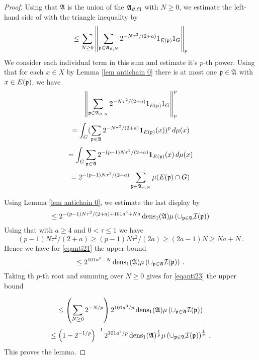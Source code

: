 \begin{proof}


Using that $\mathfrak{A}$ is the union of the
$\mathfrak{A_{\vartheta,N}}$ with $N\ge 0$,
we estimate the left-hand side of
with the triangle inequality by
\begin{equation}\label{eqanti23}
\le \sum_{N\ge 0} \left\|\sum_{\mathfrak p\in \mathfrak{A}_{\vartheta,N}} 2^{-N\tau^2/(2+a)}1_{E(\mathfrak p)} 1_G\right\|_{p}
\end{equation}
We consider each individual term in this sum and estimate it's $p$-th power.
    Using that for each $x\in X$  by Lemma \ref{lem antichain 0} there is at most one $\mathfrak p\in \mathfrak{A}$ with $x\in E(\mathfrak p)$,
    we have
    \begin{equation}
        \left\|\sum_{\mathfrak p\in \mathfrak{A}_{\vartheta,N}} 2^{-N\tau^2/(2+a)}1_{E(\mathfrak p)} 1_G\right\|_{p}^p
    \end{equation}
\begin{equation}
    =\int_G(\sum_{\mathfrak p\in\mathfrak{A}}2^{-N\tau^2/(2+a)}\mathbf{1}_{E(\mathfrak p)}(x))^p\, d\mu(x)
\end{equation}
\begin{equation}
    =   \int _G\sum_{\mathfrak p\in\mathfrak{A}}2^{-(p-1)N\tau^2/(2+a)}\mathbf{1}_{E(\mathfrak p)}(x)\, d\mu(x)
\end{equation}
\begin{equation}
    =   2^{-(p-1)N\tau^2/(2+a)} \sum_{\mathfrak p\in\mathfrak{A}_{\vartheta,N}}\mu(E(\mathfrak p)\cap G)
\end{equation}

Using Lemma \ref{lem antichain 0}, we estimate the last display by
\begin{equation}\label{eqanti21}
\le  2^{-(p-1)N\tau^2/(2+a)+101a^3+Na}\operatorname{\operatorname{dens}}_1(\mathfrak{A})\mu\left(\cup_{\mathfrak p\in\mathfrak{A}}\mathcal{I}(\mathfrak p)\right)
\end{equation}
Using that with $a\ge 4$ and $0<\tau\le 1$ we have
\begin{equation}
(p-1)N\tau^2/(2+a)\ge
(p-1)N\tau^2/(2a)\ge (2a -1)N\ge Na+N\, .
\end{equation}
Hence we have for \eqref{eqanti21} the upper bound
\begin{equation}\label{eqanti22}
\le  2^{101a^3-N}\operatorname{\operatorname{dens}}_1(\mathfrak{A})\mu\left(\cup_{\mathfrak p\in\mathfrak{A}}\mathcal{I}(\mathfrak p)\right)\, .
\end{equation}
Taking th $p$-th root and summing over $N\ge 0$ gives for \eqref{eqanti23} the upper bound

\begin{equation}
\le \left(\sum_{N\ge 0} 2^{-N/p}\right)2^{101a^3/p}\operatorname{\operatorname{dens}}_1(\mathfrak{A})\mu\left(\cup_{\mathfrak p\in\mathfrak{A}}\mathcal{I}(\mathfrak p)\right)
\end{equation}
\begin{equation}
\le \left(1-2^{-1/p}\right)^{-1}
2^{101a^3/p}
\operatorname{\operatorname{dens}}_1(\mathfrak{A})^{\frac 1p}\mu\left(\cup_{\mathfrak p\in\mathfrak{A}}\mathcal{I}(\mathfrak p)\right)^{\frac 1p}\, .
\end{equation}
This proves the lemma.
\end{proof}







